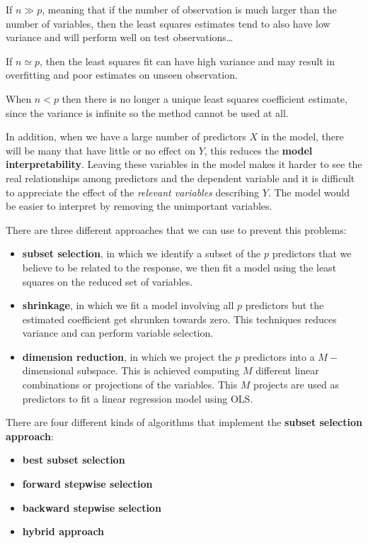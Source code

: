 If $n \gg p$, meaning that if the number of observation is much larger than the number of variables, then the least squares estimates tend to also have low variance and will perform well on test observations\dots

If $n \simeq p$, then the least squares fit can have high variance and may result in overfitting and poor estimates on unseen observation.

When $n < p$ then there is no longer a unique least squares coefficient estimate, since the variance is infinite so the method cannot be used at all.

In addition, when we have a large number of predictors $X$ in the model, there will be many that have little or no effect on $Y$, this reduces the \textbf{model interpretability}. Leaving these variables in the model makes it harder to see the real relationships among predictors and the dependent variable and it is difficult to appreciate the effect of the \textit{relevant variables} describing $Y$. The model would be easier to interpret by removing the unimportant variables.

There are three different approaches that we can use to prevent this problems:
\begin{itemize}
    \item \textbf{subset selection}, in which we identify a subset of the $p$ predictors that we believe to be related to the response, we then fit a model using the least squares on the reduced set of variables.
    \item \textbf{shrinkage}, in which we fit a model involving all $p$ predictors but the estimated coefficient get shrunken towards zero. This techniques reduces variance and can perform variable selection.
    \item \textbf{dimension reduction}, in which we project the $p$ predictors into a $M-$dimensional subspace. This is achieved computing $M$ different linear combinations or projections of the variables. This $M$ projects are used as predictors to fit a linear regression model using OLS.
\end{itemize}

There are four different kinds of algorithms that implement the \textbf{subset selection approach}:
\begin{itemize}
    \item \textbf{best subset selection}
    \item \textbf{forward stepwise selection}
    \item \textbf{backward stepwise selection}
    \item \textbf{hybrid approach}
\end{itemize}


